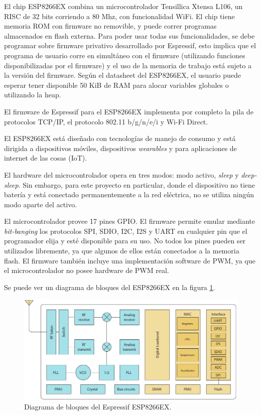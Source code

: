 El chip ESP8266EX combina un microcontrolador Tensillica Xtensa L106, un RISC de 32 bits corriendo a 80 Mhz, con funcionalidad WiFi. \cite{ESP8266Datasheet} El chip tiene memoria ROM con firmware no removible, y puede correr programas almacenados en flash externa. Para poder usar todas sus funcionalidades, se debe programar sobre firmware privativo desarrollado por Espressif, esto implica que el programa de usuario corre en simultáneo con el firmware (utilizando funciones disponibilizadas por el firmware) y el uso de la memoria de trabajo está sujeto a la versión del firmware. Según el datasheet del ESP8266EX, el usuario puede esperar tener disponible 50 KiB de RAM para alocar variables globales o utilizando la heap.

El firmware de Espressif para el ESP8266EX implementa por completo la pila de protocolos TCP/IP, el protocolo 802.11 b/g/n/e/i y Wi-Fi Direct.

El ESP8266EX está diseñado con tecnologías de manejo de consumo y está dirigida a dispositivos móviles, dispositivos \emph{wearables} y para aplicaciones de internet de las cosas (IoT).

El hardware del microcontrolador opera en tres modos: modo activo, \emph{sleep} y \emph{deep-sleep}. Sin embargo, para este proyecto en particular, donde el dispositivo no tiene batería y está conectado permanentemente a la red eléctrica, no se utiliza ningún modo aparte del activo.

El microcontrolador provee 17 pines GPIO. El firmware permite emular mediante \emph{bit-banging} los protocolos SPI, SDIO, I2C, I2S y UART en cualquier pin que el programador elija y esté disponible para su uso. No todos los pines pueden ser utilizados libremente, ya que algunos de ellos están conectados a la memoria flash. El firmware también incluye una implementación software de PWM, ya que el microcontrolador no posee hardware de PWM real.

Se puede ver un diagrama de bloques del ESP8266EX en la figura \ref{fig:diagrama-bloques-esp8266ex}.

\begin{figure}[htp!]
	\centering
	\begin{center}
	\includegraphics[width=\linewidth]{imagenes/diagrama-bloques-esp8266.pdf}
	\caption{Diagrama de bloques del Espressif ESP8266EX.}
	\label{fig:diagrama-bloques-esp8266ex}
	\end{center}
\end{figure}

